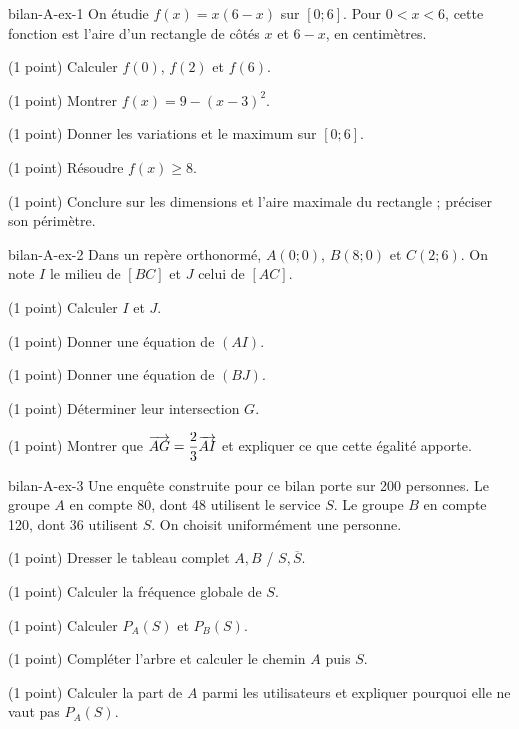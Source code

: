\begin{blocEdition}{bilan-A-ex-1}
On étudie $f(x)=x(6-x)$ sur $[0;6]$. Pour $0<x<6$, cette fonction est l’aire d’un rectangle de côtés $x$ et $6-x$, en centimètres.\begin{questions}
\item (1 point) Calculer $f(0)$, $f(2)$ et $f(6)$.
\item (1 point) Montrer $f(x)=9-(x-3)^2$.
\item (1 point) Donner les variations et le maximum sur $[0;6]$.
\item (1 point) Résoudre $f(x)\ge8$.
\item (1 point) Conclure sur les dimensions et l’aire maximale du rectangle ; préciser son périmètre.
\end{questions}\label{fig-bilan-A-ex-1}

\end{blocEdition}
\begin{blocEdition}{bilan-A-ex-2}
Dans un repère orthonormé, $A(0;0)$, $B(8;0)$ et $C(2;6)$. On note $I$ le milieu de $[BC]$ et $J$ celui de $[AC]$.\begin{questions}
\item (1 point) Calculer $I$ et $J$.
\item (1 point) Donner une équation de $(AI)$.
\item (1 point) Donner une équation de $(BJ)$.
\item (1 point) Déterminer leur intersection $G$.
\item (1 point) Montrer que $\overrightarrow{AG}=\dfrac23\overrightarrow{AI}$ et expliquer ce que cette égalité apporte.
\end{questions}\label{fig-bilan-A-ex-2}

\end{blocEdition}
\begin{blocEdition}{bilan-A-ex-3}
Une enquête construite pour ce bilan porte sur 200 personnes. Le groupe $A$ en compte 80, dont 48 utilisent le service $S$. Le groupe $B$ en compte 120, dont 36 utilisent $S$. On choisit uniformément une personne.\begin{questions}
\item (1 point) Dresser le tableau complet $A,B$ / $S,\overline S$.
\item (1 point) Calculer la fréquence globale de $S$.
\item (1 point) Calculer $P_A(S)$ et $P_B(S)$.
\item (1 point) Compléter l’arbre et calculer le chemin $A$ puis $S$.
\item (1 point) Calculer la part de $A$ parmi les utilisateurs et expliquer pourquoi elle ne vaut pas $P_A(S)$.
\end{questions}\label{fig-bilan-A-ex-3}

\end{blocEdition}
